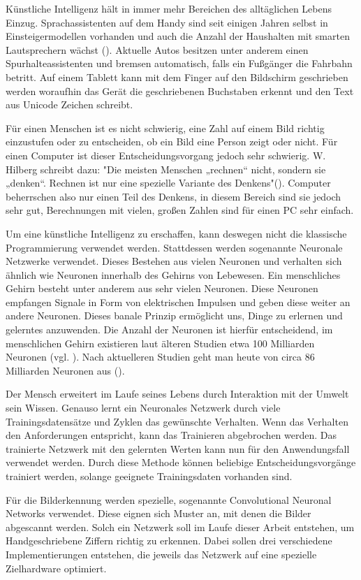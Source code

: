 \documentclass[../main.tex]{subfiles}
\begin{document}
Künstliche Intelligenz hält in immer mehr Bereichen des alltäglichen Lebens Einzug. Sprachassistenten auf dem Handy sind seit einigen Jahren selbst in Einsteigermodellen vorhanden und auch die Anzahl der Haushalten mit smarten Lautsprechern wächst (\cite{statisticSprachassistenten}). Aktuelle Autos besitzen unter anderem einen Spurhalteassistenten und bremsen automatisch, falls ein Fußgänger die Fahrbahn betritt. Auf einem Tablett kann mit dem Finger auf den Bildschirm geschrieben werden woraufhin das Gerät die geschriebenen Buchstaben erkennt und den Text aus Unicode Zeichen schreibt.

Für einen Menschen ist es nicht schwierig, eine Zahl auf einem Bild richtig einzustufen oder zu entscheiden, ob ein Bild eine Person zeigt oder nicht. Für einen Computer ist dieser Entscheidungsvorgang jedoch sehr schwierig. {W. Hilberg} schreibt dazu: "Die meisten Menschen „rechnen“ nicht, sondern sie „denken“. Rechnen ist nur eine spezielle Variante des Denkens"(\cite{articleKuenstlichesGehirn}). Computer beherrschen also nur einen Teil des Denkens, in diesem Bereich sind sie jedoch sehr gut, Berechnungen mit vielen, großen Zahlen sind für einen PC sehr einfach. 

Um eine künstliche Intelligenz zu erschaffen, kann deswegen nicht die klassische Programmierung verwendet werden. Stattdessen werden sogenannte Neuronale Netzwerke verwendet. Dieses Bestehen aus vielen Neuronen und verhalten sich ähnlich wie Neuronen innerhalb des Gehirns von Lebewesen. 
Ein menschliches Gehirn besteht unter anderem aus sehr vielen Neuronen. Diese Neuronen empfangen Signale in Form von elektrischen Impulsen und geben diese weiter an andere Neuronen. Dieses banale Prinzip ermöglicht uns, Dinge zu erlernen und gelerntes anzuwenden. Die Anzahl der Neuronen ist hierfür entscheidend, im menschlichen Gehirn existieren laut älteren Studien etwa 100 Milliarden Neuronen (vgl. \cite{articleKuenstlichesGehirn}). Nach aktuelleren Studien geht man heute von circa 86 Milliarden Neuronen aus (\cite{articleWieVieleNervenzellenHatDasGehirn}).

Der Mensch erweitert im Laufe seines Lebens durch Interaktion mit der Umwelt sein Wissen. Genauso lernt ein Neuronales Netzwerk durch viele Trainingsdatensätze und Zyklen das gewünschte Verhalten. Wenn das Verhalten den Anforderungen entspricht, kann das Trainieren abgebrochen werden. Das trainierte Netzwerk mit den gelernten Werten kann nun für den Anwendungsfall verwendet werden. Durch diese Methode können beliebige Entscheidungsvorgänge trainiert werden, solange geeignete Trainingsdaten vorhanden sind.

Für die Bilderkennung werden spezielle, sogenannte {Convolutional Neuronal Networks} verwendet. Diese eignen sich Muster an, mit denen die Bilder abgescannt werden. Solch ein Netzwerk soll im Laufe dieser Arbeit entstehen, um Handgeschriebene Ziffern richtig zu erkennen. Dabei sollen drei verschiedene Implementierungen entstehen, die jeweils das Netzwerk auf eine spezielle Zielhardware optimiert.
\end{document}
